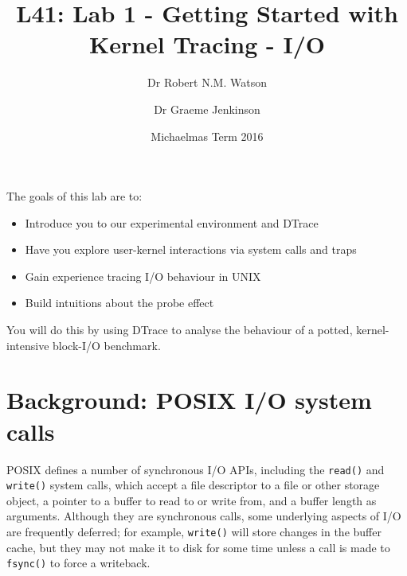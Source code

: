 \documentclass[a4paper,10pt]{article}
\begin{document}
\title{L41: Lab 1 - Getting Started with Kernel Tracing - I/O}
\author{Dr Robert N.M. Watson
	\and
	Dr Graeme Jenkinson}
\date{Michaelmas Term 2016}
\maketitle

%
%
%

\noindent
The goals of this lab are to:

\begin{itemize}
\item Introduce you to our experimental environment and DTrace
\item Have you explore user-kernel interactions via system calls and traps
\item Gain experience tracing I/O behaviour in UNIX
\item Build intuitions about the probe effect
\end{itemize}

\noindent
You will do this by using DTrace to analyse the behaviour of a potted,
kernel-intensive block-I/O benchmark.


\section*{Background: POSIX I/O system calls}

POSIX defines a number of synchronous I/O APIs, including the
\texttt{read()} and \texttt{write()} system calls, which accept a file
descriptor to a file or other storage object, a pointer to a buffer to read to
or write from, and a buffer length as arguments.
Although they are synchronous calls, some underlying aspects of I/O are
frequently deferred; for example, \texttt{write()} will store changes in the
buffer cache, but they may not make it to disk for some time unless a call is
made to \texttt{fsync()} to force a writeback.
\end{document}
